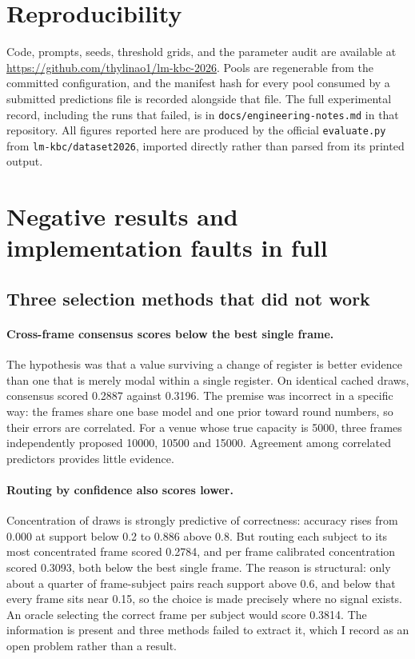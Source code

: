 \documentclass[11pt]{article}
\begin{document}


\appendix

\section{Reproducibility}
\label{app:repro}

Code, prompts, seeds, threshold grids, and the parameter audit are available at
\url{https://github.com/thylinao1/lm-kbc-2026}. Pools are regenerable from the
committed configuration, and the manifest hash for every pool consumed by a
submitted predictions file is recorded alongside that file. The full experimental
record, including the runs that failed, is in \texttt{docs/engineering-notes.md} in that
repository. All figures reported here are produced by the official
\texttt{evaluate.py} from \texttt{lm-kbc/dataset2026}, imported directly rather
than parsed from its printed output.

\section{Negative results and implementation faults in full}
\label{app:negative}

\subsection{Three selection methods that did not work}

\paragraph{Cross-frame consensus scores below the best single frame.} The
hypothesis was that a value surviving a change of register is better evidence
than one that is merely modal within a single register. On identical cached
draws, consensus scored 0.2887 against 0.3196. The premise was incorrect in a
specific way: the frames share one base model and one prior toward round numbers,
so their errors are correlated. For a venue whose true capacity is 5000, three
frames independently proposed 10000, 10500 and 15000. Agreement among correlated
predictors provides little evidence.

\paragraph{Routing by confidence also scores lower.} Concentration of draws is
strongly predictive of correctness: accuracy rises from 0.000 at support below
0.2 to 0.886 above 0.8. But routing each subject to its most concentrated frame
scored 0.2784, and per frame calibrated concentration scored 0.3093, both below
the best single frame. The reason is structural: only about a quarter of
frame-subject pairs reach support above 0.6, and below that every frame sits near
0.15, so the choice is made precisely where no signal exists. An oracle selecting
the correct frame per subject would score 0.3814. The information is present and
three methods failed to extract it, which I record as an open problem rather than
a result.
\end{document}
